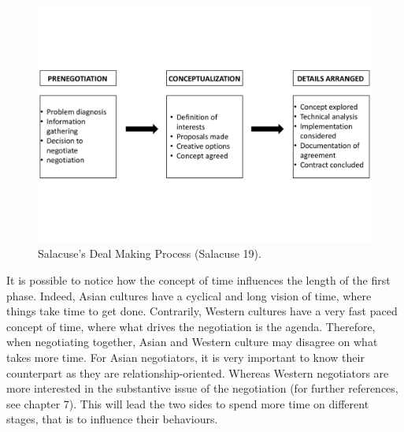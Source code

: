 \documentclass[../main.tex]{subfiles}
\begin{document}
\begin{figure}[h!]
    \centering
    \includegraphics[trim={0 4,5cm 0 4,5cm},clip, width=\textwidth]{images/salacuse.pdf}
    \caption{Salacuse's Deal Making Process (Salacuse 19).}
\end{figure}

It is possible to notice how the concept of time influences the length of the first phase. Indeed, Asian cultures have a cyclical and long vision of time, where things take time to get done. Contrarily, Western cultures have a very fast paced concept of time, where what drives the negotiation is the agenda. Therefore, when negotiating together, Asian and Western culture may disagree on what takes more time. For Asian negotiators, it is very important to know their counterpart as they are relationship-oriented. Whereas Western negotiators are more interested in the substantive issue of the negotiation (for further references, see chapter 7). This will lead the two sides to spend more time on different stages, that is to influence their behaviours.
 
\end{document}
